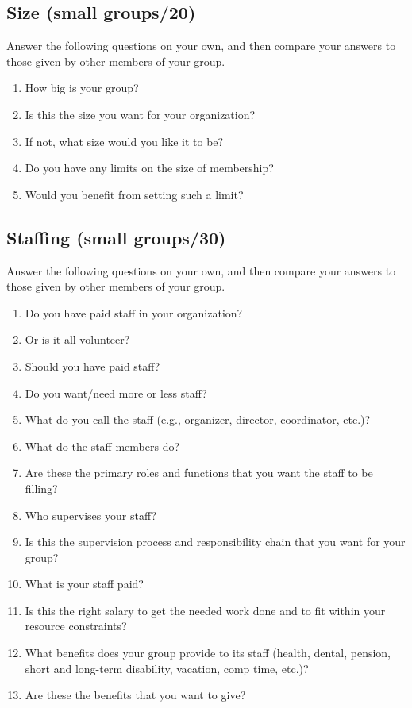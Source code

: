 \subsection{Size (small groups/20)}\label{size-small-groups20}

Answer the following questions on your own, and then compare your
answers to those given by other members of your group.

\begin{enumerate}
\item
  How big is your group?
\item
  Is this the size you want for your organization?
\item
  If not, what size would you like it to be?
\item
  Do you have any limits on the size of membership?
\item
  Would you benefit from setting such a limit?
\end{enumerate}

\subsection{Staffing (small groups/30)}\label{staffing-small-groups30}

Answer the following questions on your own, and then compare your
answers to those given by other members of your group.

\begin{enumerate}
\item
  Do you have paid staff in your organization?
\item
  Or is it all-volunteer?
\item
  Should you have paid staff?
\item
  Do you want/need more or less staff?
\item
  What do you call the staff (e.g., organizer, director, coordinator,
  etc.)?
\item
  What do the staff members do?
\item
  Are these the primary roles and functions that you want the staff to
  be filling?
\item
  Who supervises your staff?
\item
  Is this the supervision process and responsibility chain that you
  want for your group?
\item
  What is your staff paid?
\item
  Is this the right salary to get the needed work done and to fit
  within your resource constraints?
\item
  What benefits does your group provide to its staff (health, dental,
  pension, short and long-term disability, vacation, comp time, etc.)?
\item
  Are these the benefits that you want to give?
\end{enumerate}

